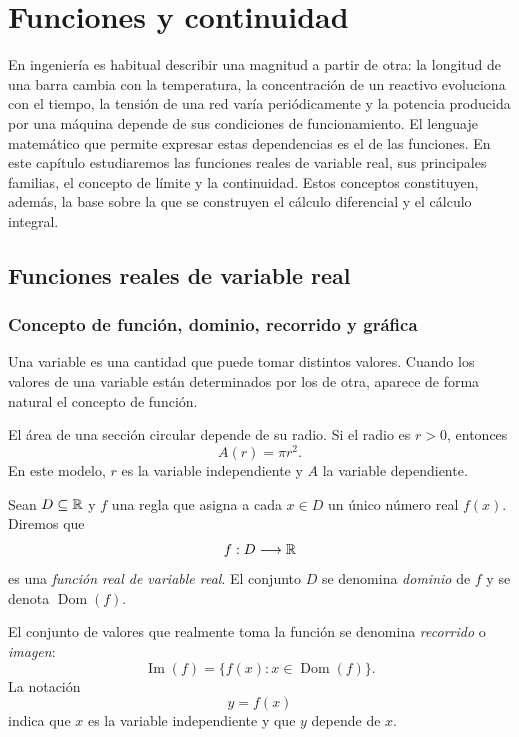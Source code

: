 \chapter{Funciones y continuidad}
\label{ch:funciones}

En ingeniería es habitual describir una magnitud a partir de otra: la longitud de una barra cambia con la temperatura, la concentración de un reactivo evoluciona con el tiempo, la tensión de una red varía periódicamente y la potencia producida por una máquina depende de sus condiciones de funcionamiento. El lenguaje matemático que permite expresar estas dependencias es el de las funciones. En este capítulo estudiaremos las funciones reales de variable real, sus principales familias, el concepto de límite y la continuidad. Estos conceptos constituyen, además, la base sobre la que se construyen el cálculo diferencial y el cálculo integral.

\section{Funciones reales de variable real}
\label{sec:funciones-reales}

\subsection{Concepto de función, dominio, recorrido y gráfica}

Una variable es una cantidad que puede tomar distintos valores. Cuando los valores de una variable están determinados por los de otra, aparece de forma natural el concepto de función.

\begin{example}
El área de una sección circular depende de su radio. Si el radio es $r>0$, entonces
\[
A(r)=\pi r^2.
\]
En este modelo, $r$ es la variable independiente y $A$ la variable dependiente.
\end{example}

\begin{definition}
Sean $D\subseteq\mathbb{R}$ y $f$ una regla que asigna a cada $x\in D$ un único número real $f(x)$. Diremos que
\[
f:D\longrightarrow\mathbb{R}
\]
es una \emph{función real de variable real}. El conjunto $D$ se denomina \emph{dominio} de $f$ y se denota $\operatorname{Dom}(f)$.
\end{definition}

El conjunto de valores que realmente toma la función se denomina \emph{recorrido} o \emph{imagen}:
\[
\operatorname{Im}(f)=\{f(x):x\in\operatorname{Dom}(f)\}.
\]
La notación
\[
y=f(x)
\]
indica que $x$ es la variable independiente y que $y$ depende de $x$.

